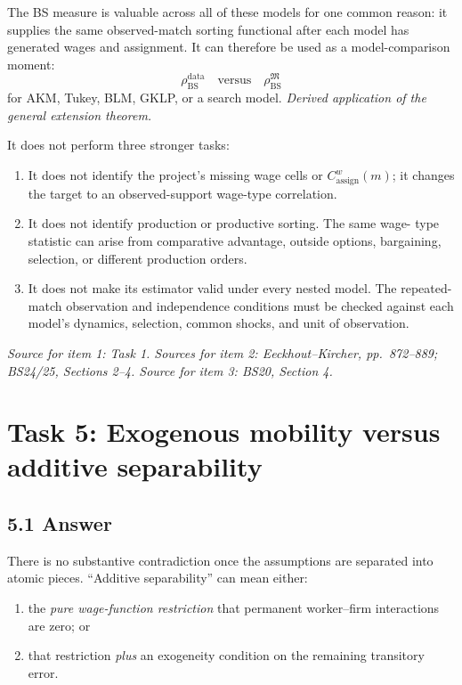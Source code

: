 \documentclass[11pt]{article}
\begin{document}
The BS measure is valuable across all of these models for one common reason:
it supplies the same observed-match sorting functional after each model has
generated wages and assignment.  It can therefore be used as a
model-comparison moment:
\[
\rho_{\mathrm{BS}}^{\mathrm{data}}
\quad\text{versus}\quad
\rho_{\mathrm{BS}}^{\mathfrak M}
\tag{T4.63}
\]
for AKM, Tukey, BLM, GKLP, or a search model.
\textit{Derived application of the general extension theorem.}

It does not perform three stronger tasks:

\begin{enumerate}
\item It does not identify the project's missing wage cells or
  \(C^w_{\mathrm{assign}}(m)\); it changes the target to an observed-support
  wage-type correlation.
\item It does not identify production or productive sorting.  The same wage-
  type statistic can arise from comparative advantage, outside options,
  bargaining, selection, or different production orders.
\item It does not make its estimator valid under every nested model.  The
  repeated-match observation and independence conditions must be checked
  against each model's dynamics, selection, common shocks, and unit of
  observation.
\end{enumerate}

\textit{Source for item 1: Task 1.  Sources for item 2:
Eeckhout--Kircher, pp.\ 872--889; BS24/25, Sections 2--4.  Source for item 3:
BS20, Section 4.}

\section{Task 5: Exogenous mobility versus additive separability}

\subsection{5.1 Answer}

There is no substantive contradiction once the assumptions are separated into
atomic pieces.  ``Additive separability'' can mean either:

\begin{enumerate}
\item the \emph{pure wage-function restriction} that permanent worker--firm
  interactions are zero; or
\item that restriction \emph{plus} an exogeneity condition on the remaining
  transitory error.
\end{enumerate}
\end{document}

